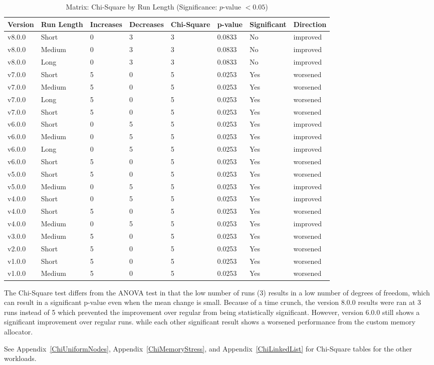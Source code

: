 \begin{table}[H]\caption{Matrix: Chi-Square by Run Length (Significance: $p$-value $<0.05$)}
\centering\footnotesize\setlength{\tabcolsep}{4pt}\renewcommand{\arraystretch}{1.15}
\begin{tabular}{llllllll}
\toprule
Version & Run Length & Increases & Decreases & Chi-Square & p-value & Significant & Direction \\ \midrule
v8.0.0 & Short & 0 & 3 & 3 & 0.0833 & No & improved \\
v8.0.0 & Medium & 0 & 3 & 3 & 0.0833 & No & improved \\
v8.0.0 & Long & 0 & 3 & 3 & 0.0833 & No & improved \\
v7.0.0 & Short & 5 & 0 & 5 & 0.0253 & Yes & worsened \\
v7.0.0 & Medium & 5 & 0 & 5 & 0.0253 & Yes & worsened \\
v7.0.0 & Long & 5 & 0 & 5 & 0.0253 & Yes & worsened \\
v7.0.0 & Short & 5 & 0 & 5 & 0.0253 & Yes & worsened \\
v6.0.0 & Short & 0 & 5 & 5 & 0.0253 & Yes & improved \\
v6.0.0 & Medium & 0 & 5 & 5 & 0.0253 & Yes & improved \\
v6.0.0 & Long & 0 & 5 & 5 & 0.0253 & Yes & improved \\
v6.0.0 & Short & 5 & 0 & 5 & 0.0253 & Yes & worsened \\
v5.0.0 & Short & 5 & 0 & 5 & 0.0253 & Yes & worsened \\
v5.0.0 & Medium & 0 & 5 & 5 & 0.0253 & Yes & improved \\
v4.0.0 & Short & 0 & 5 & 5 & 0.0253 & Yes & improved \\
v4.0.0 & Short & 5 & 0 & 5 & 0.0253 & Yes & worsened \\
v4.0.0 & Medium & 0 & 5 & 5 & 0.0253 & Yes & improved \\
v3.0.0 & Medium & 5 & 0 & 5 & 0.0253 & Yes & worsened \\
v2.0.0 & Short & 5 & 0 & 5 & 0.0253 & Yes & worsened \\
v1.0.0 & Short & 5 & 0 & 5 & 0.0253 & Yes & worsened \\
v1.0.0 & Medium & 5 & 0 & 5 & 0.0253 & Yes & worsened \\
\bottomrule\end{tabular}
\par\smallskip\parbox{0.95\textwidth}{\scriptsize}
\end{table}

The Chi-Square test differs from the ANOVA test in that the low number of runs (3) results in a low number of degrees of freedom, which can result in a significant p-value even when the mean change is small. Because of a time crunch, the version 8.0.0 results were ran at 3 runs instead of 5 which prevented the improvement over regular from being statistically significant. 
However, version 6.0.0 still shows a significant improvement over regular runs. while each other significant result shows a worsened performance from the custom memory allocator.

See Appendix~\ref{ChiUniformNodes}, Appendix~\ref{ChiMemoryStress}, and Appendix~\ref{ChiLinkedList} for Chi-Square tables for the other workloads.


